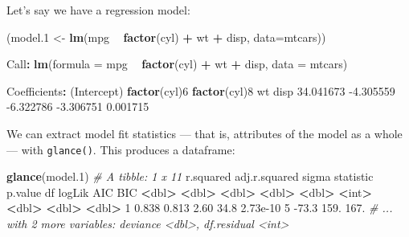 \documentclass[]{article}
\newenvironment{Shaded}{\begin{snugshade}}{\end{snugshade}}
\newcommand{\CommentTok}[1]{\textcolor[rgb]{0.56,0.35,0.01}{\textit{#1}}}
\newcommand{\DataTypeTok}[1]{\textcolor[rgb]{0.13,0.29,0.53}{#1}}
\newcommand{\DecValTok}[1]{\textcolor[rgb]{0.00,0.00,0.81}{#1}}
\newcommand{\ErrorTok}[1]{\textcolor[rgb]{0.64,0.00,0.00}{\textbf{#1}}}
\newcommand{\FloatTok}[1]{\textcolor[rgb]{0.00,0.00,0.81}{#1}}
\newcommand{\KeywordTok}[1]{\textcolor[rgb]{0.13,0.29,0.53}{\textbf{#1}}}
\newcommand{\NormalTok}[1]{#1}
\newcommand{\OperatorTok}[1]{\textcolor[rgb]{0.81,0.36,0.00}{\textbf{#1}}}
\newcommand{\StringTok}[1]{\textcolor[rgb]{0.31,0.60,0.02}{#1}}
\begin{document}
Let's say we have a regression model:

\begin{Shaded}
\begin{Highlighting}[]
\NormalTok{(model}\FloatTok{.1}\NormalTok{ <-}\StringTok{ }\KeywordTok{lm}\NormalTok{(mpg }\OperatorTok{~}\StringTok{ }\KeywordTok{factor}\NormalTok{(cyl) }\OperatorTok{+}\StringTok{ }\NormalTok{wt }\OperatorTok{+}\StringTok{ }\NormalTok{disp, }\DataTypeTok{data=}\NormalTok{mtcars))}

\NormalTok{Call}\OperatorTok{:}
\KeywordTok{lm}\NormalTok{(}\DataTypeTok{formula =}\NormalTok{ mpg }\OperatorTok{~}\StringTok{ }\KeywordTok{factor}\NormalTok{(cyl) }\OperatorTok{+}\StringTok{ }\NormalTok{wt }\OperatorTok{+}\StringTok{ }\NormalTok{disp, }\DataTypeTok{data =}\NormalTok{ mtcars)}

\NormalTok{Coefficients}\OperatorTok{:}
\StringTok{ }\NormalTok{(Intercept)  }\KeywordTok{factor}\NormalTok{(cyl)}\DecValTok{6}  \KeywordTok{factor}\NormalTok{(cyl)}\DecValTok{8}\NormalTok{            wt          disp  }
   \FloatTok{34.041673}     \FloatTok{-4.305559}     \FloatTok{-6.322786}     \FloatTok{-3.306751}      \FloatTok{0.001715}  
\end{Highlighting}
\end{Shaded}

We can extract model fit statistics --- that is, attributes of the model as a
whole --- with \texttt{glance()}. This produces a dataframe:

\begin{Shaded}
\begin{Highlighting}[]
\KeywordTok{glance}\NormalTok{(model}\FloatTok{.1}\NormalTok{)}
\CommentTok{# A tibble: 1 x 11}
\NormalTok{  r.squared adj.r.squared sigma statistic  p.value    df logLik   AIC   BIC}
      \OperatorTok{<}\NormalTok{dbl}\OperatorTok{>}\StringTok{         }\ErrorTok{<}\NormalTok{dbl}\OperatorTok{>}\StringTok{ }\ErrorTok{<}\NormalTok{dbl}\OperatorTok{>}\StringTok{     }\ErrorTok{<}\NormalTok{dbl}\OperatorTok{>}\StringTok{    }\ErrorTok{<}\NormalTok{dbl}\OperatorTok{>}\StringTok{ }\ErrorTok{<}\NormalTok{int}\OperatorTok{>}\StringTok{  }\ErrorTok{<}\NormalTok{dbl}\OperatorTok{>}\StringTok{ }\ErrorTok{<}\NormalTok{dbl}\OperatorTok{>}\StringTok{ }\ErrorTok{<}\NormalTok{dbl}\OperatorTok{>}
\DecValTok{1}     \FloatTok{0.838}         \FloatTok{0.813}  \FloatTok{2.60}      \FloatTok{34.8} \FloatTok{2.73e-10}     \DecValTok{5}  \FloatTok{-73.3}  \FloatTok{159.}  \FloatTok{167.}
\CommentTok{# ... with 2 more variables: deviance <dbl>, df.residual <int>}
\end{Highlighting}
\end{Shaded}
\end{document}
